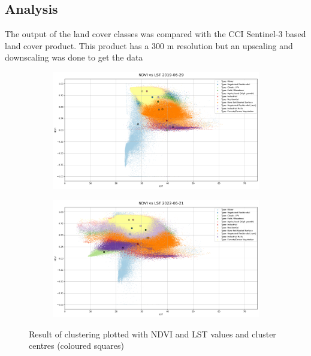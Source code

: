 \documentclass[12pt,a4paper, english,twoside]{article}
\begin{document}
 \subsection{Analysis}\label{sec:landcoverAnalysis} 
  The output of the land cover classes was compared with the CCI Sentinel-3 based land cover product. This product has a 300 m resolution but an upscaling and downscaling was done to get the data
  \begin{figure}[!htbp]
     \begin{subfigure}[b]{\textwidth}
         \centering
         \includegraphics[width=\textwidth]{img/NDVI vs LST 2019-06-29.png}
         \label{fig:ndvilst01}
     \end{subfigure}

     \begin{subfigure}[b]{\textwidth}
         \centering
         \includegraphics[width=\textwidth]{img/NDVI vs LST 2022-06-21.png}
         \label{fig:ndvilst02}
     \end{subfigure}
          \caption{Result of clustering plotted with \gls{NDVI} and \gls{LST} values and cluster centres (coloured squares) \label{fig:kmeansclusters}}
        \end{figure}
\end{document}
